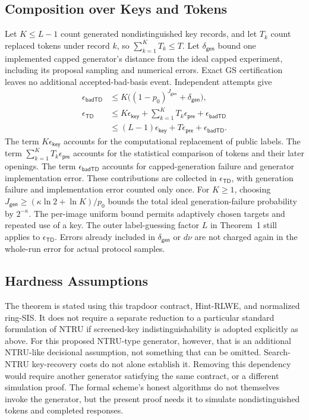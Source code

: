 \documentclass[lettersize,journal]{IEEEtran}
\begin{document}
	\subsection{Composition over Keys and Tokens}
	Let $K\leq L-1$ count generated nondistinguished key records, and let
	$T_k$ count replaced tokens under record $k$, so $\sum_{k=1}^KT_k\leq T$.
	Let $\delta_{\mathsf{gen}}$ bound one implemented capped generator's
	distance from the ideal capped experiment, including its proposal
	sampling and numerical errors. Exact GS certification leaves no
	additional accepted-bad-basis event. Independent attempts give
	\[
	\begin{aligned}
		\epsilon_{\mathsf{badTD}}
		&\leq K\bigl((1-p_0)^{J_{\mathsf{gen}}}
		+\delta_{\mathsf{gen}}\bigr),\\
		\epsilon_{\mathsf{TD}}
		&\leq K\epsilon_{\mathsf{key}}
		+\sum_{k=1}^K T_k\epsilon_{\mathsf{pre}}
		+\epsilon_{\mathsf{badTD}}\\
		&\leq (L-1)\epsilon_{\mathsf{key}}
		+T\epsilon_{\mathsf{pre}}+\epsilon_{\mathsf{badTD}}.
	\end{aligned}
	\]
	The term $K\epsilon_{\mathsf{key}}$ accounts for the computational
	replacement of public labels.
	The term $\sum_{k=1}^{K}T_k\epsilon_{\mathsf{pre}}$ accounts for the
	statistical comparison of tokens and their later openings.
	The term $\epsilon_{\mathsf{badTD}}$ accounts for capped-generation
	failure and generator implementation error.
	These contributions are collected in $\epsilon_{\mathsf{TD}}$,
	with generation failure and implementation error counted only once. For $K\geq1$, choosing
	$J_{\mathsf{gen}}\geq(\kappa\ln2+\ln K)/p_0$ bounds the total ideal
	generation-failure probability by $2^{-\kappa}$. The per-image uniform
	bound permits adaptively chosen targets and repeated use of a key.
	The outer label-guessing factor $L$ in Theorem~1 still applies to
	$\epsilon_{\mathsf{TD}}$. Errors already included in
	$\delta_{\mathsf{gen}}$ or $d\nu$ are not charged again in the
	whole-run error for actual protocol samples.
	
	\subsection{Hardness Assumptions}
	The theorem is stated using this trapdoor contract, Hint-RLWE, and
	normalized ring-SIS. It does not require a separate reduction to a
	particular standard formulation of NTRU if screened-key
	indistinguishability is adopted explicitly as above. For this proposed
	NTRU-type generator, however, that is an additional NTRU-like
	decisional assumption, not something that can be omitted. Search-NTRU
	key-recovery costs do not alone establish it. Removing this dependency
	would require another generator satisfying the same contract, or a
	different simulation proof. The formal scheme's honest algorithms do
	not themselves invoke the generator, but the present proof needs it
	to simulate nondistinguished tokens and completed responses.
	
\end{document}
